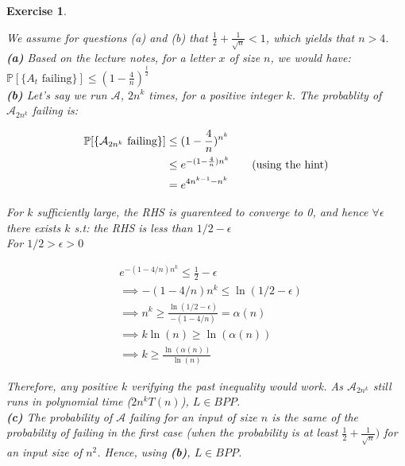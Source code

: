 \documentclass{article}
\newtheorem{exo}{Exercise}
\def\P{\mathbb{P}}
\begin{document}
\begin{exo}{\ \\}

We assume for questions (a) and (b) that $\frac{1}{2}+\frac{1}{\sqrt{n}} < 1$, which yields that $n > 4$.   \\
\noindent
\textbf{(a)}
Based on the lecture notes, for a letter $x$ of size $n$, we would have: $ \P[\{ \text{{$A_t$ failing}} \}] \leq (1-\frac{4}{n})^{\frac{t}{2}} $ \\


\noindent
\textbf{(b)} Let's say we run $\mathcal{A}$, $2n^k$ times, for a positive integer $k$. The probablity of $\mathcal{A}_{2n^k}$ failing is:


\begin{align*}
    \P[\text{\{$\mathcal{A}_{2n^k}$ failing\}}] &\leq (1-\frac{4}{n})^{n^k} \\
    &\leq e^{-(1-\frac{4}{n})n^k}   \text{\quad \quad (using the hint)} \\
    &= e^{4n^{k-1} - n^k} \\
\end{align*}
 
For $k$ sufficiently large, the RHS is guarenteed to converge to 0, and hence $\forall \epsilon$ there exists $k$ s.t: the RHS is less than $1/2 - \epsilon$ \\

For $1/2 >\epsilon > 0$

\begin{align*}
    & e^{-(1-4/n)n^k} \leq \frac{1}{2} - \epsilon \\
    &\implies -(1-4/n)n^k \leq \ln(1/2 - \epsilon) \\
    &\implies n^k \geq \frac{\ln(1/2 - \epsilon)}{-(1-4/n)} = \alpha(n) \\
    &\implies k \ln(n) \geq \ln(\alpha(n)) \\
    &\implies k \geq \frac{\ln(\alpha(n))}{\ln(n)} 
\end{align*}

Therefore, any positive $k$ verifying the past inequality would work. As $\mathcal{A}_{2n^k}$ still runs in polynomial time ($2n^k T(n)$), $L \in BPP$.  \\ 


  \noindent
\textbf{(c)}
The probability of $\mathcal{A}$ failing for an input of size $n$ is the same of the probability of failing in the first case (when the probability is at least $\frac{1}{2}+\frac{1}{\sqrt{n}})$ for an input size of $n^2$. Hence, using \textbf{(b)}, $L \in BPP$.

\end{exo}
\end{document}
